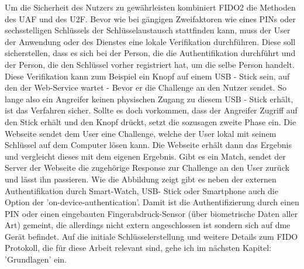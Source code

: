 Um die Sicherheit des Nutzers zu gewährleisten kombiniert FIDO2 die Methoden des UAF und des U2F. Bevor wie bei gängigen Zweifaktoren wie eines PINs oder sechsstelligen Schlüssels der Schlüsselaustausch stattfinden kann, muss der User der Anwendung oder des Dienstes eine lokale Verifikation durchführen. Diese soll sicherstellen, dass es sich bei der Person, die die Authentifikation durchführt und der Person, die den Schlüssel vorher registriert hat, um die selbe Person handelt. Diese Verifikation kann zum Beispiel ein Knopf auf einem USB - Stick sein, auf den der Web-Service wartet - Bevor er die Challenge an den Nutzer sendet. So lange also ein Angreifer keinen physischen Zugang zu diesem USB - Stick erhält, ist das Verfahren sicher. Sollte es doch vorkommen, dass der Angreifer Zugriff auf den Stick erhält und den Knopf drückt, setzt die sozusagen zweite Phase ein. Die Webseite sendet dem User eine Challenge, welche der User lokal mit seinem Schlüssel auf dem Computer lösen kann. Die Webseite erhält dann das Ergebnis und vergleicht dieses mit dem eigenen Ergebnis. Gibt es ein Match, sendet der Server der Webseite die zugehörige Response zur Challenge an den User zurück und lässt ihn passieren. Wie die Abbildung zeigt gibt es neben der externen Authentifikation durch Smart-Watch, USB- Stick oder Smartphone auch die Option der 'on-device-authentication'. Damit ist die Authentifizierung durch einen PIN oder einen eingebauten Fingerabdruck-Sensor (über biometrische Daten aller Art) gemeint, die allerdings nicht extern angeschlossen ist sondern sich auf dme Gerät befindet. Auf die initiale Schlüsselerstellung und weitere Details zum FIDO Protokoll, die für diese Arbeit relevant sind, gehe ich im nächsten Kapitel: 'Grundlagen' ein.

